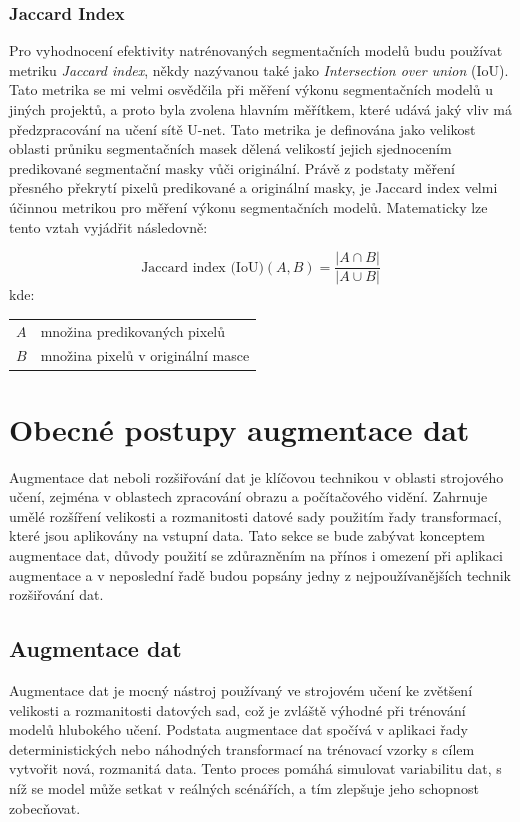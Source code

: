 \documentclass[male,czech,api_ing]{thesis}
\makeatletter
\newenvironment{conditions}[1][kde:]
    {#1 \begin{tabular}[t]{>{$}l<{$} @{${}={}$} >{\raggedright\arraybackslash}p{10cm}}}
    {\end{tabular}}
\makeatother
\begin{document}
\subsubsection{Jaccard Index}
Pro vyhodnocení efektivity natrénovaných segmentačních modelů budu používat metriku \textit{Jaccard index}, někdy nazývanou také jako \textit{Intersection over union} (IoU). Tato metrika se mi velmi osvědčila při měření výkonu segmentačních modelů u jiných projektů, a proto byla zvolena hlavním měřítkem, které udává jaký vliv má předzpracování na učení sítě U-net. Tato metrika je definována jako velikost oblasti průniku segmentačních masek dělená velikostí jejich sjednocením predikované segmentační masky vůči originální. Právě z podstaty měření přesného překrytí pixelů predikované a originální masky, je Jaccard index velmi účinnou metrikou pro měření výkonu segmentačních modelů. Matematicky lze tento vztah vyjádřit následovně:

\begin{equation}
    \text{Jaccard index (IoU)}(A, B) = \frac{|A \cap B|}{|A \cup B|}
\end{equation}
\begin{conditions}
    A & množina predikovaných pixelů \\
    B & množina pixelů v originální masce \\
\end{conditions}

\section{Obecné postupy augmentace dat}
Augmentace dat neboli rozšiřování dat je klíčovou technikou v oblasti strojového učení, zejména v oblastech zpracování obrazu a počítačového vidění. Zahrnuje umělé rozšíření velikosti a rozmanitosti datové sady použitím řady transformací, které jsou aplikovány na vstupní data. Tato sekce se bude zabývat konceptem augmentace dat, důvody použití se zdůrazněním na přínos i omezení při aplikaci augmentace a v neposlední řadě budou popsány jedny z nejpoužívanějších technik rozšiřování dat.

\subsection{Augmentace dat}
Augmentace dat je mocný nástroj používaný ve strojovém učení ke zvětšení velikosti a rozmanitosti datových sad, což je zvláště výhodné při trénování modelů hlubokého učení. Podstata augmentace dat spočívá v aplikaci řady deterministických nebo náhodných transformací na trénovací vzorky s cílem vytvořit nová, rozmanitá data. Tento proces pomáhá simulovat variabilitu dat, s níž se model může setkat v reálných scénářích, a tím zlepšuje jeho schopnost zobecňovat.
\end{document}
